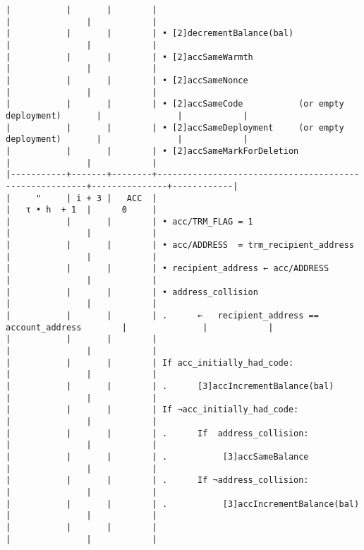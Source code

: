 \documentclass[varwidth=\maxdimen,margin=0.5cm,multi={verbatim}]{standalone}
\begin{document}
\begin{verbatim}
|           |       |        |                                                        |               |            |
|           |       |        | • [2]decrementBalance(bal)                             |               |            |
|           |       |        | • [2]accSameWarmth                                     |               |            |
|           |       |        | • [2]accSameNonce                                      |               |            |
|           |       |        | • [2]accSameCode           (or empty deployment)       |               |            |
|           |       |        | • [2]accSameDeployment     (or empty deployment)       |               |            |
|           |       |        | • [2]accSameMarkForDeletion                            |               |            |
|-----------+-------+--------+--------------------------------------------------------+---------------+------------|
|     "     | i + 3 |   ACC  |                                                        |   τ • h  + 1  |      0     |
|           |       |        | • acc/TRM_FLAG = 1                                     |               |            |
|           |       |        | • acc/ADDRESS  = trm_recipient_address                 |               |            |
|           |       |        | • recipient_address ← acc/ADDRESS                      |               |            |
|           |       |        | • address_collision                                    |               |            |
|           |       |        | .      ←   recipient_address == account_address        |               |            |
|           |       |        |                                                        |               |            |
|           |       |        | If acc_initially_had_code:                             |               |            |
|           |       |        | .      [3]accIncrementBalance(bal)                     |               |            |
|           |       |        | If ¬acc_initially_had_code:                            |               |            |
|           |       |        | .      If  address_collision:                          |               |            |
|           |       |        | .           [3]accSameBalance                          |               |            |
|           |       |        | .      If ¬address_collision:                          |               |            |
|           |       |        | .           [3]accIncrementBalance(bal)                |               |            |
|           |       |        |                                                        |               |            |

\end{verbatim}
\end{document}
